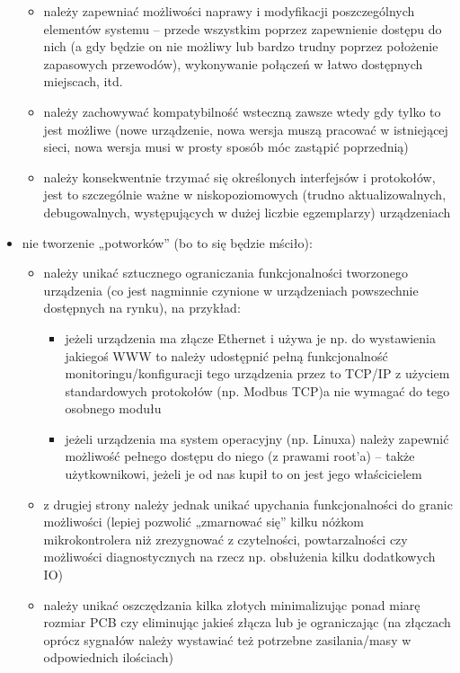 \begin{itemize}
\begin{itemize}
			\item należy zapewniać możliwości naprawy i modyfikacji poszczególnych elementów systemu – przede wszystkim poprzez zapewnienie dostępu do nich
				(a gdy będzie on nie możliwy lub bardzo trudny poprzez położenie zapasowych przewodów), wykonywanie połączeń w łatwo dostępnych miejscach, itd.
			\item należy zachowywać kompatybilność wsteczną zawsze wtedy gdy tylko to jest możliwe (nowe urządzenie, nowa wersja muszą pracować w istniejącej sieci, nowa wersja musi w prosty sposób móc zastąpić poprzednią)
			\item należy konsekwentnie trzymać się określonych interfejsów i protokołów, jest to szczególnie ważne w niskopoziomowych (trudno aktualizowalnych, debugowalnych, występujących w dużej liczbie egzemplarzy) urządzeniach
		\end{itemize}
	\item nie tworzenie „potworków” (bo to się będzie mściło):
		\begin{itemize}
			\item należy unikać sztucznego ograniczania funkcjonalności tworzonego urządzenia (co jest nagminnie czynione w urządzeniach powszechnie dostępnych na rynku), na przykład:
				\begin{itemize}
					\item jeżeli urządzenia ma złącze Ethernet i używa je np. do wystawienia jakiegoś WWW to należy udostępnić pełną funkcjonalność monitoringu/konfiguracji tego urządzenia przez to TCP/IP z użyciem standardowych protokołów (np. Modbus TCP)a nie wymagać do tego osobnego modułu
					\item jeżeli urządzenia ma system operacyjny (np. Linuxa) należy zapewnić możliwość pełnego dostępu do niego (z prawami root'a) – także użytkownikowi, jeżeli je od nas kupił to on jest jego właścicielem
				\end{itemize}
			\item z drugiej strony należy jednak unikać upychania funkcjonalności do granic możliwości
				(lepiej pozwolić „zmarnować się” kilku nóżkom mikrokontrolera niż zrezygnować z czytelności, powtarzalności czy możliwości diagnostycznych na rzecz np. obsłużenia kilku dodatkowych IO)
			\item należy unikać oszczędzania kilka złotych minimalizując ponad miarę rozmiar PCB czy eliminując jakieś złącza lub je ograniczając
				(na złączach oprócz sygnałów należy wystawiać też potrzebne zasilania/masy w odpowiednich ilościach)
			

\end{itemize}
\end{itemize}
